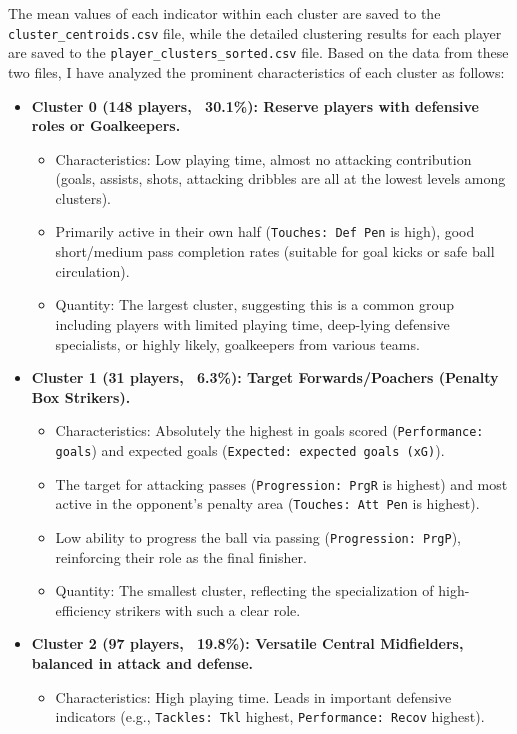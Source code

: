 \documentclass[12pt, a4paper]{report}
\begin{document}
The mean values of each indicator within each cluster are saved to the \texttt{cluster\_centroids.csv} file, while the detailed clustering results for each player are saved to the \texttt{player\_clusters\_sorted.csv} file.
Based on the data from these two files, I have analyzed the prominent characteristics of each cluster as follows:
\begin{itemize}
    \item \textbf{Cluster 0 (148 players, ~30.1\%): Reserve players with defensive roles or Goalkeepers.}
    \begin{itemize}
        \item Characteristics: Low playing time, almost no attacking contribution (goals, assists, shots, attacking dribbles are all at the lowest levels among clusters).
        \item Primarily active in their own half (\texttt{Touches: Def Pen} is high), good short/medium pass completion rates (suitable for goal kicks or safe ball circulation).
        \item Quantity: The largest cluster, suggesting this is a common group including players with limited playing time, deep-lying defensive specialists, or highly likely, goalkeepers from various teams.
    \end{itemize}
    \item \textbf{Cluster 1 (31 players, ~6.3\%): Target Forwards/Poachers (Penalty Box Strikers).}
    \begin{itemize}
        \item Characteristics: Absolutely the highest in goals scored (\texttt{Performance: goals}) and expected goals (\texttt{Expected: expected goals (xG)}).
        \item The target for attacking passes (\texttt{Progression: PrgR} is highest) and most active in the opponent's penalty area (\texttt{Touches: Att Pen} is highest).
        \item Low ability to progress the ball via passing (\texttt{Progression: PrgP}), reinforcing their role as the final finisher.
        \item Quantity: The smallest cluster, reflecting the specialization of high-efficiency strikers with such a clear role.
    \end{itemize}
    \item \textbf{Cluster 2 (97 players, ~19.8\%): Versatile Central Midfielders, balanced in attack and defense.}
    \begin{itemize}
        \item Characteristics: High playing time. Leads in important defensive indicators (e.g., \texttt{Tackles: Tkl} highest, \texttt{Performance: Recov} highest).

\end{itemize}
\end{itemize}
\end{document}
